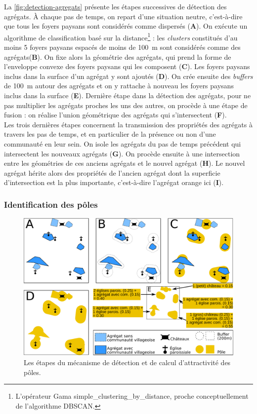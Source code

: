 La \cref{fig:detection-agregats} présente les étapes successives de détection des agrégats.
À chaque pas de temps, on repart d'une situation \og neutre\fg{}, c'est-à-dire que tous les foyers paysans sont considérés comme dispersés (\textbf{A}).
On exécute un algorithme de classification basé sur la distance\footnote{
L'opérateur Gama \textsf{simple\_clustering\_by\_distance}, proche conceptuellement de l'algorithme DBSCAN.
} : les \textit{clusters} constitués d'au moins 5 foyers paysans espacés de moins de 100~m sont considérés comme des agrégats(\textbf{B}).
On fixe alors la géométrie des agrégats, qui prend la forme de l'enveloppe convexe des foyers paysans qui les composent (\textbf{C}).
Les foyers paysans inclus dans la surface d'un agrégat y sont ajoutés (\textbf{D}).
On crée ensuite des \textit{buffers} de 100~m autour des agrégats et on y rattache à nouveau les foyers paysans inclus dans la surface (\textbf{E}).
Dernière étape dans la détection des agrégats, pour ne pas multiplier les agrégats proches les uns des autres, on procède à une étape de fusion : on réalise l'union géométrique des agrégats qui s'intersectent (\textbf{F}).\\
Les trois dernières étapes concernent la transmission des propriétés des agrégats à travers les pas de temps, et en particulier de la présence ou non d'une communauté en leur sein.
On isole les agrégats du pas de temps précédent qui intersectent les nouveaux agrégats (\textbf{G}).
On procède ensuite à une intersection entre les géométries de ces anciens agrégats et le nouvel agrégat (\textbf{H}).
Le nouvel agrégat hérite alors des propriétés de l'ancien agrégat dont la superficie d'intersection est la plus importante, c'est-à-dire l'agrégat orange ici (\textbf{I}).
	
	\subsubsection{Identification des pôles \label{sssec:poles}}

\begin{figure}[H]
	\centering
	\includegraphics[width=\linewidth]{img/detection_poles.pdf}
	\caption{Les étapes du mécanisme de détection et de calcul d'attractivité des pôles.}
	\label{fig:detection-poles}
\end{figure}

